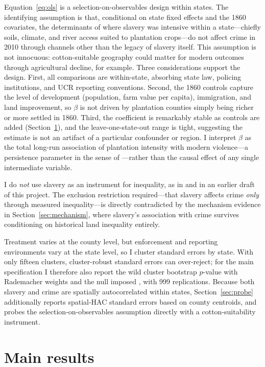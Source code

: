 \documentclass[12pt]{article}
\begin{document}
Equation~\eqref{eq:ols} is a selection-on-observables design within states. The identifying assumption is that, conditional on state fixed effects and the 1860 covariates, the determinants of where slavery was intensive within a state---chiefly soils, climate, and river access suited to plantation crops---do not affect crime in 2010 through channels other than the legacy of slavery itself. This assumption is not innocuous: cotton-suitable geography could matter for modern outcomes through agricultural decline, for example. Three considerations support the design. First, all comparisons are within-state, absorbing state law, policing institutions, and UCR reporting conventions. Second, the 1860 controls capture the level of development (population, farm value per capita), immigration, and land improvement, so $\beta$ is not driven by plantation counties simply being richer or more settled in 1860. Third, the coefficient is remarkably stable as controls are added (Section~\ref{sec:results}), and the leave-one-state-out range is tight, suggesting the estimate is not an artifact of a particular confounder or region. I interpret $\beta$ as the total long-run association of plantation intensity with modern violence---a persistence parameter in the sense of \citet{abs2016}---rather than the causal effect of any single intermediate variable.

I do \emph{not} use slavery as an instrument for inequality, as in \citet{buonanno2019} and in an earlier draft of this project. The exclusion restriction required---that slavery affects crime \emph{only} through measured inequality---is directly contradicted by the mechanism evidence in Section~\ref{sec:mechanism}, where slavery's association with crime survives conditioning on historical land inequality entirely.

Treatment varies at the county level, but enforcement and reporting environments vary at the state level, so I cluster standard errors by state. With only fifteen clusters, cluster-robust standard errors can over-reject; for the main specification I therefore also report the wild cluster bootstrap $p$-value with Rademacher weights and the null imposed \citep{cgm2008}, with 999 replications. Because both slavery and crime are spatially autocorrelated within states, Section~\ref{sec:probe} additionally reports \citet{conley1999} spatial-HAC standard errors based on county centroids, and probes the selection-on-observables assumption directly with a cotton-suitability instrument.

\section{Main results}\label{sec:results}
\end{document}
